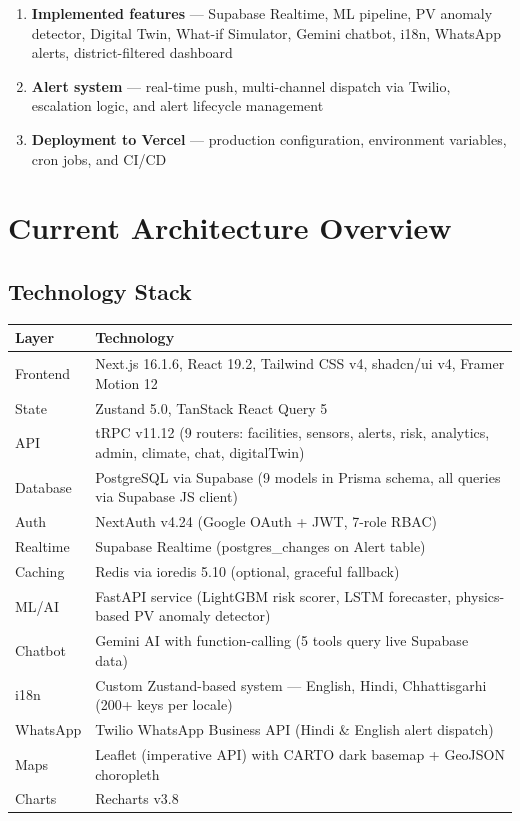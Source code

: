 \documentclass[12pt,a4paper]{report}
\begin{document}
\begin{enumerate}
  \item \textbf{Implemented features} --- Supabase Realtime, ML pipeline, PV anomaly detector, Digital Twin, What-if Simulator, Gemini chatbot, i18n, WhatsApp alerts, district-filtered dashboard
  \item \textbf{Alert system} --- real-time push, multi-channel dispatch via Twilio, escalation logic, and alert lifecycle management
  \item \textbf{Deployment to Vercel} --- production configuration, environment variables, cron jobs, and CI/CD
\end{enumerate}

\chapter{Current Architecture Overview}

\section{Technology Stack}

\begin{tabularx}{\textwidth}{lX}
\toprule
\textbf{Layer} & \textbf{Technology} \\
\midrule
Frontend   & Next.js 16.1.6, React 19.2, Tailwind CSS v4, shadcn/ui v4, Framer Motion 12 \\
State      & Zustand 5.0, TanStack React Query 5 \\
API        & tRPC v11.12 (9 routers: facilities, sensors, alerts, risk, analytics, admin, climate, chat, digitalTwin) \\
Database   & PostgreSQL via Supabase (9 models in Prisma schema, all queries via Supabase JS client) \\
Auth       & NextAuth v4.24 (Google OAuth + JWT, 7-role RBAC) \\
Realtime   & Supabase Realtime (postgres\_changes on Alert table) \\
Caching    & Redis via ioredis 5.10 (optional, graceful fallback) \\
ML/AI      & FastAPI service (LightGBM risk scorer, LSTM forecaster, physics-based PV anomaly detector) \\
Chatbot    & Gemini AI with function-calling (5 tools query live Supabase data) \\
i18n       & Custom Zustand-based system --- English, Hindi, Chhattisgarhi (200+ keys per locale) \\
WhatsApp   & Twilio WhatsApp Business API (Hindi \& English alert dispatch) \\
Maps       & Leaflet (imperative API) with CARTO dark basemap + GeoJSON choropleth \\
Charts     & Recharts v3.8 \\
\bottomrule
\end{tabularx}
\end{document}
